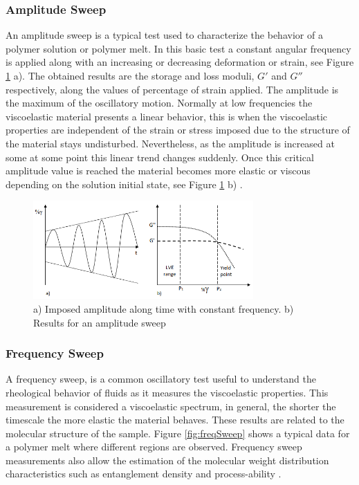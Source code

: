 \subsubsection{Amplitude Sweep}
An amplitude sweep is a typical test used to characterize the behavior of a polymer
solution or polymer melt. In this basic test a constant angular frequency is applied along with an increasing or decreasing deformation or strain, see Figure \ref{fig:ampSweep} a). The obtained results are the storage and loss moduli, $G'$ and $G''$ respectively, along the values of percentage of strain applied. The amplitude is the maximum of the oscillatory motion. Normally at low frequencies the viscoelastic material presents a linear behavior, this is when the viscoelastic properties are independent of the strain or stress imposed due to the structure of the material stays undisturbed. Nevertheless, as the amplitude is increased at some at some point this linear trend changes suddenly. Once this critical amplitude value is reached the material becomes more elastic or viscous depending on the solution initial state, see Figure \ref{fig:ampSweep} b) \cite{Flores2017}.

\begin{figure}[th]
\centering
\includegraphics[width=0.75\textwidth]{./Figures/ampSweep.png}
\decoRule
\caption[Amplitude Sweep]{a) Imposed amplitude along time with constant frequency. b) Results for an amplitude sweep \cite{Flores2017}}
\label{fig:ampSweep}
\end{figure}

\subsubsection{Frequency Sweep}
A frequency sweep, is a common oscillatory test useful to understand the rheological behavior of fluids as it measures the viscoelastic properties. This measurement is considered a viscoelastic spectrum, in general, the shorter the timescale the more elastic the material behaves. These results are related to the molecular structure of the sample. Figure \ref{fig:freqSweep} shows a typical data for a polymer melt where different regions are observed. Frequency sweep measurements also allow the estimation of the molecular weight distribution characteristics such as entanglement density and process-ability \cite{Flores2017}. 

